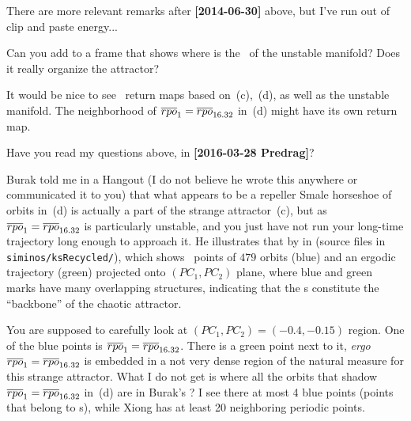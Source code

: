 \begin{description}
There are more relevant remarks after {\bf [2014-06-30]} above, but I've
run out of clip and paste energy...

\item[2016-04-08 Predrag to Xiong]
Can you add to   a frame that shows where is the
\PoincSec\ of the  unstable manifold? Does it really organize the
attractor?

\item[2016-04-08 Predrag to Xiong]
It would be nice to see \Poincare\ return maps based on
\,(c), \,(d), as well
as the  unstable manifold.
The neighborhood of $\overline{rpo}_{1}=\overline{rpo}_{16.32}$ in \,(d)
might have its own return map.

\item[2016-04-08 Predrag to Xiong]
Have you read my questions above, in {\bf [2016-03-28 Predrag]}?

\item[2016-04-08 Midwife to Xiong]
Burak told me in a Hangout (I do not believe he wrote this anywhere or
communicated it to you) that what appears to be a repeller Smale horseshoe of
orbits in \,(d) is actually a part of the strange attractor
\,(c), but as $\overline{rpo}_{1}=\overline{rpo}_{16.32}$ is particularly unstable, and
you just have not run your long-time trajectory long enough to approach
it. He illustrates that by  in 
(source files in \texttt{siminos/ksRecycled/}), which shows \PoincSec\ points
of $479$ orbits (blue) and an ergodic trajectory (green) projected onto
$(PC_1, PC_2)$ plane, where blue and green marks have many overlapping
structures, indicating that the \po s constitute the ``backbone'' of the
chaotic attractor.

You are supposed to carefully look at $(PC_1,PC_2)=(-0.4,-0.15)$ region.
One of the blue points is $\overline{rpo}_{1}=\overline{rpo}_{16.32}$. There is a green point next to
it, \emph{ergo} $\overline{rpo}_{1}=\overline{rpo}_{16.32}$ is embedded in a not very dense region of
the natural measure for this strange attractor. What I do not get is
where all the orbits that shadow $\overline{rpo}_{1}=\overline{rpo}_{16.32}$ in
\,(d) are in Burak's ? I see there
at most 4 blue points (points that belong to \po s), while Xiong has at
least 20 neighboring periodic points.

\end{description}
